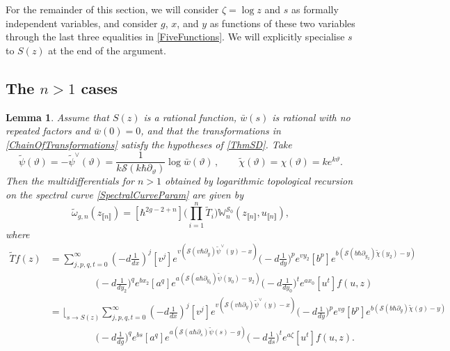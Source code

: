 \documentclass[10pt,a4paper,oneside,no-math,reqno]{amsart}%
\theoremstyle{plain}
\newtheorem{lemma}[theorem]{Lemma}
\theoremstyle{definition}
\theoremstyle{remark}
\numberwithin{equation}{section}
\renewcommand{\theta}{\vartheta}
\newcommand{\mb}[1]{\mathbb{#1}}
\newcommand{\mc}[1]{\mathcal{#1}}
\newcommand{\1}{\mathds{1}}
\newcommand{\<}{\langle}
\renewcommand{\>}{\rangle}
\newcommand{\del}{\partial}
\begin{document}
For the remainder of this section, we will consider $ \zeta = \log z$ and $ s$ as formally independent variables, and consider $ g$, $ x$, and $ y$ as functions of these two variables through the last three equalities in \cref{FiveFunctions}. We will explicitly specialise $ s$ to $ S(z)$ at the end of the argument.



\subsection{The \texorpdfstring{$ n > 1$}{n>1} cases}


\begin{lemma}\label{DualitiesPreserveTR}
	Assume that $ S(z)$ is a rational function, $ \bar{w}(s)$ is rational with no repeated factors and $\bar{w}(0)=0$, and that the transformations in \eqref{ChainOfTransformations} satisfy the hypotheses of \cref{ThmSD}. Take
	\begin{equation}\label{TransformationDeformations}
		\tilde{\psi} ( \theta )
		=
		- \tilde{\psi}^\vee (\theta)
		=
		\frac{1}{k \mc{S}( k \hbar \del_\theta )} \log \bar{w}(\theta )
		\,,
		\qquad
		\tilde{\chi} (\theta )
		=
		\chi (\theta )
		=
		k e^{k \theta} .
	\end{equation}
	Then the multidifferentials for $ n > 1$ obtained by logarithmic topological recursion on the spectral curve \cref{SpectralCurveParam} are given by
	\begin{equation}
		\tilde{\omega}_{g,n} (z_{\llbracket n\rrbracket}) 
		=
		[\hbar^{2g-2+n}] \Big( \prod_{i=1}^n \tilde{T}_i \Big) \mb{W}_n^{\mc{S}_0} (z_{\llbracket n\rrbracket}, u_{\llbracket n\rrbracket}) ,
	\end{equation}
	where
	\begin{equation}
	\begin{split}
		\tilde{T} f (z)
		&=
		\sum_{j,p,q,t=0}^\infty (-d \frac{1}{dx})^j [v^j] 
		e^{v ( \mc{S}(v\hbar \del_{y}) \tilde{\psi}^\vee (y) - x )} \big( -d \frac{1}{dy} \big)^p e^{vy_2} [b^p ]
		e^{b ( \mc{S}(b \hbar \del_{y_2}) \tilde{\chi}(y_2) - y )} 
		\\
		&\hspace{2cm}
		\big( -d \frac{1}{dy_2} \big)^q e^{bx_2} [a^q ]
		e^{a ( \mc{S}(a\hbar \del_{y_0}) \tilde{\psi}(y_0) - y_2 )} \big( -d \frac{1}{dy_0} \big)^t e^{ax_0} [u^t ]
		f(u,z)
		\\
		&=
		\Big\lfloor_{s \to S(z)} \sum_{j,p,q,t=0}^\infty (-d \frac{1}{dx})^j [v^j] 
		e^{v ( \mc{S}(v\hbar \del_{y}) \tilde{\psi}^\vee(y) - x )} \big( -d \frac{1}{dy} \big)^p e^{vg} [b^p ]
		e^{b ( \mc{S}(b\hbar \del_g) \tilde{\chi}(g) - y )}
		\\
		&\hspace{2cm}
		\big( -d \frac{1}{dg} \big)^q e^{bs} [a^q ]
		e^{a ( \mc{S}(a\hbar \del_{s}) \tilde{\psi}(s) - g )} \big( -d \frac{1}{ds} \big)^t e^{a\zeta} [u^t ]
		f(u,z) .
	\end{split}
	\end{equation}
\end{lemma}
\end{document}
